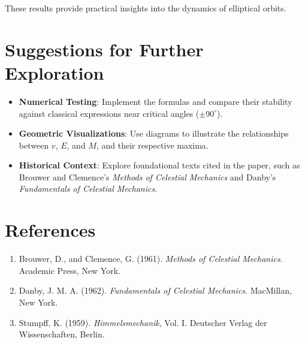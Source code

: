 \documentclass[11pt]{article}
\begin{document}
These results provide practical insights into the dynamics of elliptical orbits.

\section*{Suggestions for Further Exploration}
\begin{itemize}
    \item \textbf{Numerical Testing}: Implement the formulas and compare their stability against classical expressions near critical angles (\(\pm 90^\circ\)).
    \item \textbf{Geometric Visualizations}: Use diagrams to illustrate the relationships between \(v\), \(E\), and \(M\), and their respective maxima.
    \item \textbf{Historical Context}: Explore foundational texts cited in the paper, such as Brouwer and Clemence's \textit{Methods of Celestial Mechanics} and Danby's \textit{Fundamentals of Celestial Mechanics}.
\end{itemize}

\section*{References}
\begin{enumerate}
    \item Brouwer, D., and Clemence, G. (1961). \textit{Methods of Celestial Mechanics}. Academic Press, New York.
    \item Danby, J. M. A. (1962). \textit{Fundamentals of Celestial Mechanics}. MacMillan, New York.
    \item Stumpff, K. (1959). \textit{Himmelsmechanik}, Vol. I. Deutscher Verlag der Wissenschaften, Berlin.
\end{enumerate}
\end{document}
